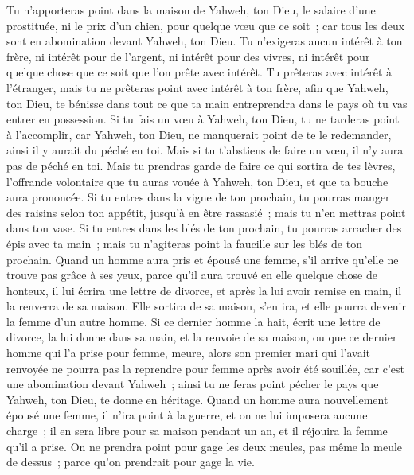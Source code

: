 \begin{multicols}{2}
Tu n'apporteras point dans la maison de Yahweh, ton Dieu, le salaire d'une prostituée, ni le prix d'un chien, pour quelque vœu que ce soit~; car tous les deux sont en abomination devant Yahweh, ton Dieu.
Tu n'exigeras aucun intérêt à ton frère, ni intérêt pour de l'argent, ni intérêt pour des vivres, ni intérêt pour quelque chose que ce soit que l'on prête avec intérêt.
Tu prêteras avec intérêt à l'étranger, mais tu ne prêteras point avec intérêt à ton frère, afin que Yahweh, ton Dieu, te bénisse dans tout ce que ta main entreprendra dans le pays où tu vas entrer en possession.
Si tu fais un vœu à Yahweh, ton Dieu, tu ne tarderas point à l'accomplir, car Yahweh, ton Dieu, ne manquerait point de te le redemander, ainsi il y aurait du péché en toi.
Mais si tu t'abstiens de faire un vœu, il n'y aura pas de péché en toi.
Mais tu prendras garde de faire ce qui sortira de tes lèvres, l'offrande volontaire que tu auras vouée à Yahweh, ton Dieu, et que ta bouche aura prononcée.
Si tu entres dans la vigne de ton prochain, tu pourras manger des raisins selon ton appétit, jusqu'à en être rassasié~; mais tu n'en mettras point dans ton vase.
Si tu entres dans les blés de ton prochain, tu pourras arracher des épis avec ta main~; mais tu n'agiteras point la faucille sur les blés de ton prochain.
\VerseOne{}Quand un homme aura pris et épousé une femme, s'il arrive qu'elle ne trouve pas grâce à ses yeux, parce qu'il aura trouvé en elle quelque chose de honteux, il lui écrira une lettre de divorce, et après la lui avoir remise en main, il la renverra de sa maison.
Elle sortira de sa maison, s'en ira, et elle pourra devenir la femme d'un autre homme.
Si ce dernier homme la hait, écrit une lettre de divorce, la lui donne dans sa main, et la renvoie de sa maison, ou que ce dernier homme qui l'a prise pour femme, meure,
alors son premier mari qui l'avait renvoyée ne pourra pas la reprendre pour femme après avoir été souillée, car c'est une abomination devant Yahweh~; ainsi tu ne feras point pécher le pays que Yahweh, ton Dieu, te donne en héritage.
Quand un homme aura nouvellement épousé une femme, il n'ira point à la guerre, et on ne lui imposera aucune charge~; il en sera libre pour sa maison pendant un an, et il réjouira la femme qu'il a prise.
On ne prendra point pour gage les deux meules, pas même la meule de dessus~; parce qu'on prendrait pour gage la vie.

\end{multicols}

